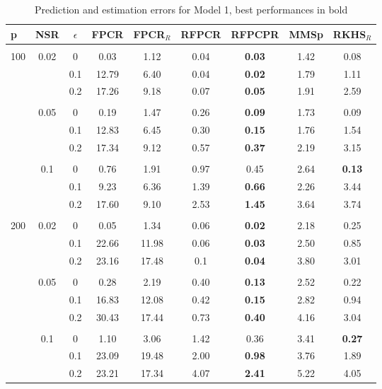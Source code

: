 \documentclass[11pt]{article}
\begin{document}
\begin{table}[ht!]
\centering
{\small
\vspace{0.5cm} 
\begin{tabular}{l| c| c | c c c c c c }
p & NSR & $\epsilon$ & FPCR & FPCR$_R$ & RFPCR & RFPCPR & MMSp & RKHS$_R$   \\ \hline\hline  \\[-0.2cm]
\multirow{9}{*}{100} & \multirow{3}{*}{0.02} & 0 & 0.03 & 1.12 &  0.04 & \textbf{0.03} & 1.42 & 0.08 \\ 
& & 0.1 & 12.79 &   6.40 & 0.04 & \textbf{0.02} & 1.79 & 1.11 \\
& & 0.2 & 17.26 & 9.18 & 0.07 & \textbf{0.05} & 1.91 & 2.59 \\\cline{2-9} \\[-0.3cm]
& \multirow{3}{*}{0.05} & 0 &  0.19 &  1.47 & 0.26  & \textbf{0.09} & 1.73  & 0.09 \\
& & 0.1 & 12.83 & 6.45	  &  0.30 & \textbf{0.15} & 1.76 & 1.54 \\ 
& & 0.2 & 17.34  &  9.12 & 0.57 & \textbf{0.37} & 2.19  & 3.15 \\ \cline{2-9} \\[-0.3cm]
& \multirow{3}{*}{0.1} & 0 &  0.76 & 1.91 & 0.97 & 0.45 & 2.64 &  \textbf{0.13} \\  
& & 0.1 & 9.23 &  6.36 & 1.39 & \textbf{0.66} & 2.26 & 3.44 \\ 
& & 0.2 & 17.60  &  9.10 & 2.53 & \textbf{1.45} & 3.64 & 3.74  \\\cline{1-9} \\[-0.3cm]
\multirow{9}{*}{200} & \multirow{3}{*}{0.02} & 0 & 0.05 & 1.34 & 0.06 & \textbf{0.02} & 2.18 & 0.25 \\ 
& & 0.1 & 22.66 & 11.98 & 0.06 & \textbf{0.03} & 2.50 & 0.85 \\
& & 0.2 & 23.16 & 17.48 & 0.1 & \textbf{0.04} & 3.80 & 3.01 \\\cline{2-9} \\[-0.3cm]
& \multirow{3}{*}{0.05} & 0 & 0.28 &  2.19  & 0.40 & \textbf{0.13} & 2.52 & 0.22	 \\
& & 0.1 & 16.83 & 12.08 &  0.42 & \textbf{0.15} & 2.82 & 0.94 \\ 
& & 0.2 &  30.43 & 17.44 & 0.73 & \textbf{0.40} & 4.16 & 3.04 \\\cline{2-9} \\[-0.3cm]
& \multirow{3}{*}{0.1} & 0 &  1.10 & 3.06 & 1.42 & 0.36 & 3.41 & \textbf{0.27} \\  
& & 0.1 & 23.09 & 19.48 & 2.00 & \textbf{0.98} &	3.76 & 1.89	\\ 
& & 0.2 &  23.21 &   17.34 &  4.07 & \textbf{2.41} & 5.22 & 4.05 \\\cline{1-9}
\end{tabular}}
\caption{Prediction and estimation errors for Model 1, best performances in bold}
\end{table}
\end{document}
